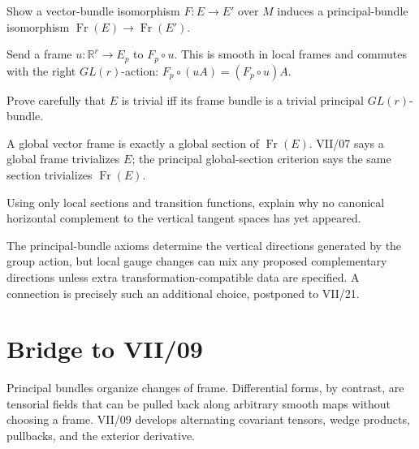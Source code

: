 \begin{problem}\label{prob:vii08-ch03}
Show a vector-bundle isomorphism \(F:E\to E'\) over \(M\) induces a principal-bundle isomorphism \(\operatorname{Fr}(E)\to\operatorname{Fr}(E')\).
\end{problem}
\begin{solution}
Send a frame \(u:\mathbb R^r\to E_p\) to \(F_p\circ u\). This is smooth in local frames and commutes with the right \(GL(r)\)-action: \(F_p\circ(uA)=(F_p\circ u)A\).
\end{solution}

\begin{problem}\label{prob:vii08-ch04}
Prove carefully that \(E\) is trivial iff its frame bundle is a trivial principal \(GL(r)\)-bundle.
\end{problem}
\begin{solution}
A global vector frame is exactly a global section of \(\operatorname{Fr}(E)\). VII/07 says a global frame trivializes \(E\); the principal global-section criterion says the same section trivializes \(\operatorname{Fr}(E)\).
\end{solution}

\begin{problem}\label{prob:vii08-ch05}
Using only local sections and transition functions, explain why no canonical horizontal complement to the vertical tangent spaces has yet appeared.
\end{problem}
\begin{solution}
The principal-bundle axioms determine the vertical directions generated by the group action, but local gauge changes can mix any proposed complementary directions unless extra transformation-compatible data are specified. A connection is precisely such an additional choice, postponed to VII/21.
\end{solution}

\section*{Bridge to VII/09}
Principal bundles organize changes of frame. Differential forms, by contrast, are tensorial fields that can be pulled back along arbitrary smooth maps without choosing a frame. VII/09 develops alternating covariant tensors, wedge products, pullbacks, and the exterior derivative.
